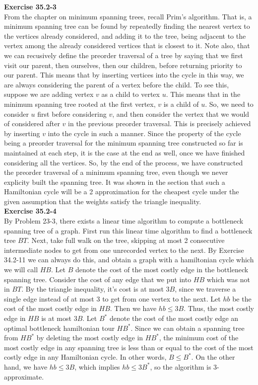 \documentclass{article}
\begin{document}
\noindent\textbf{Exercise 35.2-3}\\

From the chapter on minimum spanning trees, recall Prim's algorithm. That is, a minimum spanning tree can be found by repeatedly finding the nearest vertex to the vertices already considered, and adding it to the tree, being adjacent to the vertex among the already considered vertices that is closest to it. Note also, that we can recusively define the preorder traversal of a tree by saying that we first visit our parent, then ourselves, then our children, before returning priority to our parent. This means that by inserting vertices into the cycle in this way, we are always considering the parent of a vertex before the child. To see this, suppose we are adding vertex $v$ as a child to vertex $u$. This means that in the minimum spanning tree rooted at the first vertex, $v$ is a child of $u$. So, we need to consider $u$ first before considering $v$, and then consider the vertex that we would of considered after $v$ in the previous preorder traversal. This is precisely achieved by inserting $v$ into the cycle in such a manner. Since the property of the cycle being a preorder traversal for the minimum spanning tree constructed so far is maintained at each step, it is the case at the end as well, once we have finished considering all the vertices.  So, by the end of the process, we have constructed the preorder traversal of a minimum spanning tree, even though we never explicity built the spanning tree. It was shown in the section that such a Hamiltonian cycle will be a 2 approximation for the cheapest cycle under the given assumption that the weights satisfy the triangle inequality.\\

\noindent\textbf{Exercise 35.2-4}\\

By Problem 23-3, there exists a linear time algorithm to compute a bottleneck spanning tree of a graph.  First run this linear time algorithm to find a bottleneck tree $BT$. Next, take full walk on the tree, skipping at most 2 consecutive intermediate nodes to get from one unrecorded vertex to the next.  By Exercise 34.2-11 we can always do this, and obtain a graph with a hamiltonian cycle which we will call $HB$.  Let $B$ denote the cost of the most costly edge in the bottleneck spanning tree.  Consider the cost of any edge that we put into $HB$ which was not in $BT$.  By the triangle inequality, it's cost is at most $3B$, since we traverse a single edge instead of at most 3 to get from one vertex to the next.   Let $hb$ be the cost of the most costly edge in $HB$.  Then we have $hb \leq 3B$.  Thus, the most costly edge in $HB$ is at most $3B$.  Let $B^*$ denote the cost of the most costly edge an optimal bottleneck hamiltonian tour $HB^*$.  Since we can obtain a spanning tree from $HB^*$ by deleting the most costly edge in $HB^*$, the minimum cost of the most costly edge in any spanning tree is less than or equal to the cost of the most costly edge in any Hamiltonian cycle.  In other words, $B \leq B^*$.  On the other hand, we have $hb \leq 3B$, which implies $hb \leq 3B^*$, so the algorithm is 3-approximate.  \\
\end{document}
